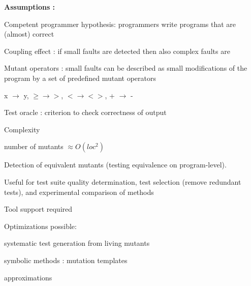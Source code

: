 \textbf{Assumptions :}
\begin{itemize*}
\item Competent programmer hypothesis: programmers write programs that are (almost) correct
\item Coupling effect : if small faults are detected then also complex faults are
\item Mutant operators : small faults can be described as small modifications of the program by a set of predefined mutant operators
\begin{itemize*}
\item x $\rightarrow$ y,  $\geq \rightarrow > $, $ < \rightarrow <>$, + $\rightarrow$ -
\end{itemize*}
\item Test oracle : criterion to check correctness of output
\item Complexity
	\begin{itemize*}
		\item  number of mutants $\approx O(loc^2)$
	\end{itemize*}
\item Detection of equivalent mutants (testing equivalence on program-level).
\item Useful for test suite quality determination, test selection (remove redundant tests), and experimental comparison of methods
\item Tool support required
\item Optimizations possible:
\begin{itemize*}
\item systematic test generation from living mutants
\item symbolic methods : mutation templates
\item approximations
\end{itemize*}
\end{itemize*}